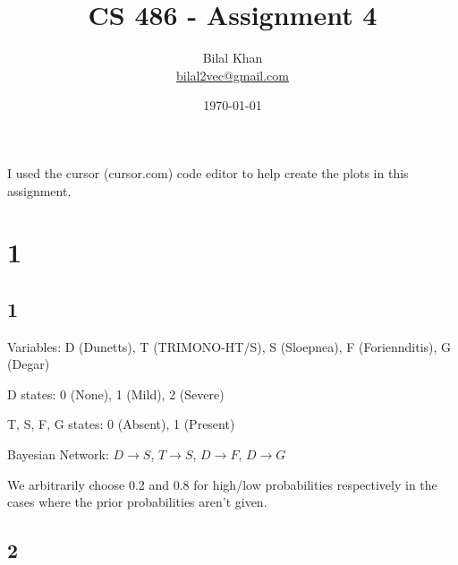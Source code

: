 \documentclass[11pt]{article}
\title{CS 486 - Assignment 4}
\author{Bilal Khan\\
\href{mailto:bilal2vec@gmail.com}{bilal2vec@gmail.com}}
\date{\today}
\begin{document}
\maketitle
\tableofcontents

I used the cursor (cursor.com) code editor to help create the plots in this assignment.

\section{1}

\subsection{1}

Variables: D (Dunetts), T (TRIMONO-HT/S), S (Sloepnea), F (Foriennditis), G (Degar)

D states: 0 (None), 1 (Mild), 2 (Severe)

T, S, F, G states: 0 (Absent), 1 (Present)

Bayesian Network: $D \rightarrow S$, $T \rightarrow S$, $D \rightarrow F$, $D \rightarrow G$

We arbitrarily choose 0.2 and 0.8 for high/low probabilities respectively in the cases where the prior probabilities aren't given.

\subsection{2}
\end{document}
